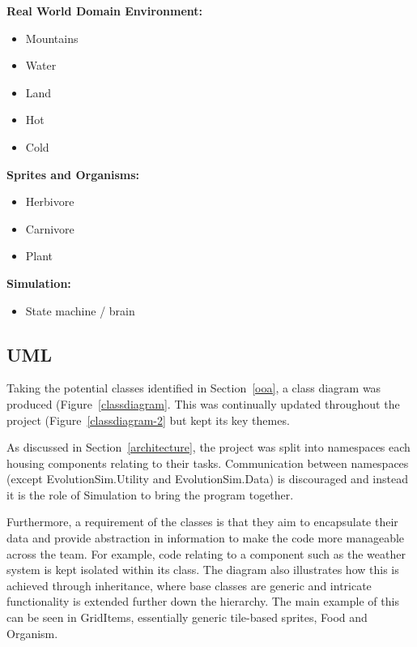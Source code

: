 \documentclass[a4paper, oneside, 11pt]{report}
\begin{document}
\textbf{Real World Domain Environment:}
\begin{itemize}
\item Mountains
\item Water
\item Land
\item Hot
\item Cold
\end{itemize}

\textbf{Sprites and Organisms:}
\begin{itemize}
\item Herbivore 
\item Carnivore 
\item Plant
\end{itemize}

\textbf{Simulation:}
\begin{itemize}
\item State machine / brain
\end{itemize}

\subsection{UML}

Taking the potential classes identified in Section~\ref{ooa}, a class diagram was produced (Figure~\ref{classdiagram}. This was continually updated throughout the project (Figure~\ref{classdiagram-2} but kept its key themes.

As discussed in Section~\ref{architecture}, the project was split into namespaces each housing components relating to their tasks. Communication between namespaces (except EvolutionSim.Utility and EvolutionSim.Data) is discouraged and instead it is the role of Simulation to bring the program together.

Furthermore, a requirement of the classes is that they aim to encapsulate their data and provide abstraction in information to make the code more manageable across the team. For example, code relating to a component such as the weather system is kept isolated within its class. The diagram also illustrates how this is achieved through inheritance, where base classes are generic and intricate functionality is extended further down the hierarchy. The main example of this can be seen in GridItems, essentially generic tile-based sprites, Food and Organism.
\end{document}
